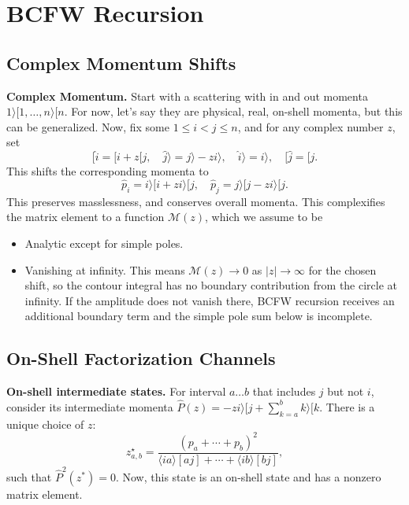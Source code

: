 \section{BCFW Recursion}
\label{sec:bcfw-recursion}


\subsection{Complex Momentum Shifts}
\label{subsec:complex-momentum-shifts}

\textbf{Complex Momentum.} 
Start with a scattering with in and out momenta $1 \rangle[1, \ldots, n \rangle [n $. For now, let's say they are physical, real, on-shell momenta, but this can be generalized. Now, fix some $1 \le i < j \le n$, and for any complex number $z$, set
\[
	[\hat{i} = [i + z [j, \quad
	\hat{j} \rangle = j \rangle - z i \rangle, \quad
	\hat{i} \rangle = i \rangle, \quad
	[ \hat{j} = [ j
.\]
This shifts the corresponding momenta to
\[
	\hat{p} _i = i \rangle [i + z i \rangle [j , \quad
	\hat{p} _j = j \rangle [j - z i \rangle [j
.\] 
This preserves masslessness, and conserves overall momenta. This complexifies the matrix element to a function $\mathcal{M}(z)$, which we assume to be
	\begin{itemize}
		\item Analytic except for simple poles.
		\item Vanishing at infinity.
		This means $\mathcal{M}(z) \to 0$ as $|z| \to \infty$ for the chosen shift, so the contour integral has no boundary contribution from the circle at infinity. If the amplitude does not vanish there, BCFW recursion receives an additional boundary term and the simple pole sum below is incomplete.
	\end{itemize}

\subsection{On-Shell Factorization Channels}
\label{subsec:on-shell-factorization-channels}

\textbf{On-shell intermediate states.} For interval $a \ldots b$ that includes $j$ but not $i$, consider its intermediate momenta $\hat{P} (z) = - z i \rangle [j + \sum_{k = a}^b k \rangle [k$. There is a unique choice of $z$:
\[
z_{a, b}^{\star}=\frac{\left(p_a+\cdots+p_b\right)^2}{\langle i a\rangle[a j]+\cdots+\langle i b\rangle[b j]}
,\] 
such that $\hat{P} ^2(z^*) = 0$. Now, this state is an on-shell state and has a nonzero matrix element.


